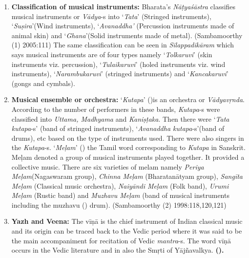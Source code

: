 \begin{enumerate}[{\rm 1.}]
\itemsep=0pt
\item \textbf{Classification of musical instruments:} Bharata’s \textit{Nāṭyaśāstra} classifies musical instruments or \textit{Vādya}-s into ‘\textit{Tata}’ (Stringed instruments), ‘\textit{Suṣira}’(Wind instruments), ‘\textit{Avanaddha’ }(Percussion instruments made of animal skin) and ‘\textit{Ghana}’(Solid instruments made of metal). (Sambamoorthy (1) 2005:111) The same classification can be seen in \textit{Silappadikāram} which says musical instruments are of four types namely ‘\textit{Tolkaruvi}’ (skin instruments viz. percussion), ‘\textit{Tulaikaruvi}’ (holed instruments viz. wind instruments), ‘\textit{Narambu\-karuvi}’ (stringed instruments) and ‘\textit{Kancakaruvi}’ (gongs and cymbals).

 \item \textbf{Musical ensemble or orchestra:} ‘\textit{Kutapa}’ ()is an orchestra or \textit{Vādyavṛnda}. According to the number of performers in these bands, \textit{Kutapa}-s were classified into \textit{Uttama, Madhyama} and \textit{Kaniṣṭaka}. Then there were ‘\textit{Tata kutapa}-s’ (band of stringed instruments), ‘\textit{Avanaddha kutapa}-s’(band of drums), etc based on the type of instruments used. There were also singers in the \textit{Kutapa}-s. ‘\textit{Meḷam}’ () the Tamil word corresponding to \textit{Kutapa} in Sanskrit. Meḷam denoted a group of musical instruments played together. It provided a collective music. There are six varieties of melam namely \textit{Periya Meḷam}(Nagaswaram group), \textit{Chinna Meḷam} (Bharatanātyam group), \textit{Sangīta Meḷam} (Classical music orchestra), \textit{Naiyāndi Meḷam} (Folk band), \textit{Urumi Meḷam} (Rustic band) and \textit{Muzhavu Meḷam} (band of musical instruments including the muzhavu () drum). (Sambamoorthy (2) 1998:118,120,121)

 \item \textbf{Yazh and Veena:} The vīṇā is the chief instrument of Indian classical music and its origin can be traced back to the Vedic period where it was said to be the main accompaniment for recitation of Vedic \textit{mantra}-s. The word vīṇā occurs in the Vedic literature and in also the Smṛti of Yājñavalkya. \textbf{().}

\end{enumerate}

